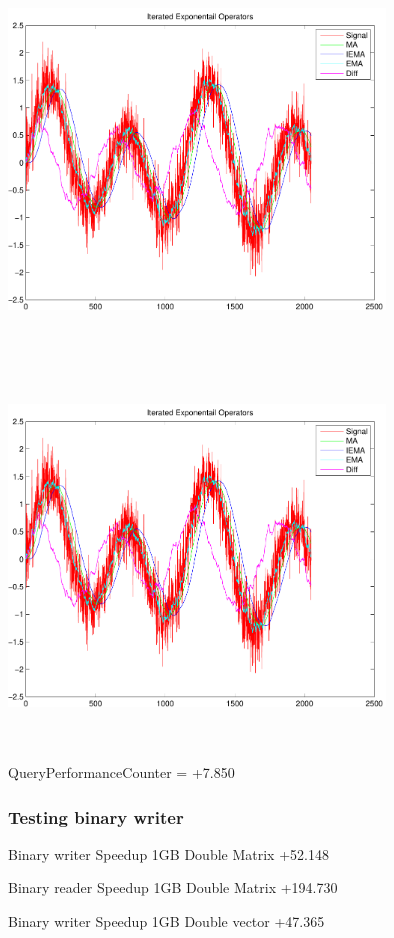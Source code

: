 \documentclass[9pt]{article}
\theoremstyle{plain}
\theoremstyle{definition}
\theoremstyle{remark}
\numberwithin{equation}{section}
\begin{document}
\includegraphics[width=10.0cm,height=10.0cm]{IteratedExponentailOperators.pdf}

\includegraphics[width=10.0cm,height=10.0cm]{IteratedExponentailOperators.pdf}

QueryPerformanceCounter  =  +7.850
\subsubsection{Testing binary writer}
Binary writer Speedup 1GB Double Matrix +52.148

Binary reader Speedup 1GB Double Matrix +194.730

Binary writer Speedup 1GB Double vector +47.365
\end{document}
